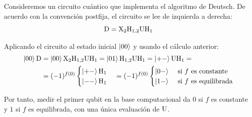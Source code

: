 Consideremos un circuito cuántico que implementa el algoritmo de Deutsch.
De acuerdo con la convención postfija, el circuito se lee de izquierda a derecha:
\[
	\text{D}=\text{X}_2\text{H}_{1,2}\text{U}\text{H}_1
\]

Aplicando el circuito al estado inicial $\ket{00}$ y usando el cálculo anterior:
\begin{equation}
	\label{eq:deutchs-circuit}
	\begin{split}
		\ket{00}\text{D}&=\ket{00}\text{X}_2\text{H}_{1,2}\text{U}\text{H}_1=\ket{01}\text{H}_{1,2}\text{U}\text{H}_1=\ket{+-}\text{U}\text{H}_1=\\
		&=(-1)^{f(0)}
		\begin{cases}
			\ket{+-}\text{H}_1\\
			\ket{--}\text{H}_1
		\end{cases}
		=(-1)^{f(0)}
		\begin{cases}
			\ket{0-} & \text{ si $f$ es constante}\\
			\ket{1-} & \text{ si $f$ es equilibrada}
		\end{cases}
	\end{split}
\end{equation}

Por tanto, medir el primer qubit en la base computacional da $0$ si $f$ es constante y $1$ si $f$ es equilibrada, con una única evaluación de $\text{U}$.
